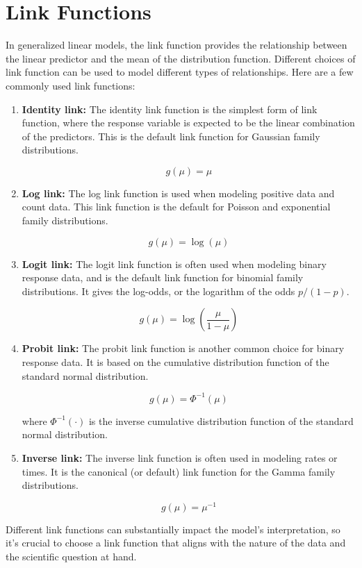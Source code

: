 \chapter{Link Functions}


In generalized linear models, the link function provides the
relationship between the linear predictor and the mean of the
distribution function. Different choices of link function can be used
to model different types of relationships. Here are a few commonly
used link functions:

\begin{enumerate}

\item \textbf{Identity link:} The identity link function is the
  simplest form of link function, where the response variable is
  expected to be the linear combination of the predictors. This is the
  default link function for Gaussian family distributions.

\[
g(\mu) = \mu
\]

\item \textbf{Log link:} The log link function is used when modeling
  positive data and count data. This link function is the default for
  Poisson and exponential family distributions.

\[
g(\mu) = \log(\mu)
\]

\item \textbf{Logit link:} The logit link function is often used when
  modeling binary response data, and is the default link function for
  binomial family distributions. It gives the log-odds, or the
  logarithm of the odds $p/(1-p)$. 

\[
g(\mu) = \log\left(\frac{\mu}{1-\mu}\right)
\]

\item \textbf{Probit link:} The probit link function is another common
  choice for binary response data. It is based on the cumulative
  distribution function of the standard normal distribution.

\[
g(\mu) = \Phi^{-1}(\mu)
\]

where $\Phi^{-1}(\cdot)$ is the inverse cumulative distribution
function of the standard normal distribution.

\item \textbf{Inverse link:} The inverse link function is often used
  in modeling rates or times. It is the canonical (or default) link
  function for the Gamma family distributions.

\[
g(\mu) = \mu^{-1}
\]

\end{enumerate}

Different link functions can substantially impact the model's
interpretation, so it's crucial to choose a link function that aligns
with the nature of the data and the scientific question at hand.
